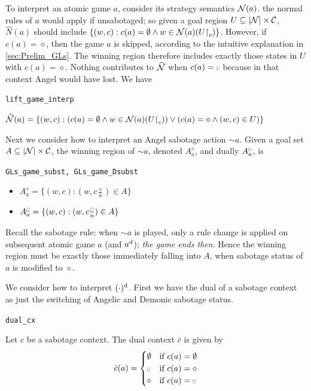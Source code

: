 To interpret an atomic game $a$, consider its strategy semantics $\mathcal N(a)$. the normal rules of $a$ would apply if unsabotaged; so given a goal region $U\subseteq |\mathcal N|\times \mathcal C$, $\widehat N (a)$ should include $\{(w,c): c(a)=\emptyset \wedge w\in \mathcal N(a)(U\mathord{\upharpoonright} _c)\}$. However, if $c(a)=\diamond$, then the game $a$ is skipped, according to the intuitive explanation in \autoref{sec:Prelim_GLs}. The winning region therefore includes exactly those states in $U$ with $c(a)=\diamond$. Nothing contributes to $\widehat {\mathcal{N}}$ when $c(a)=\ssquare$ because in that context Angel would have lost. We have

\begin{bdefinition}
\texttt{lift\_game\_interp}

$\widehat {\mathcal N} (a) = \{(w,c): (c(a)=\emptyset \wedge w\in \mathcal N(a)(U\mathord{\upharpoonright} _c)) \vee (c(a)=\diamond \wedge (w,c)\in U)\}$    
\end{bdefinition}


Next we consider how to interpret an Angel sabotage action $\sim a$. Given a goal set $A\subseteq |\mathcal N|\times \mathcal C$, the winning region of $\sim a$, denoted $A_a^\diamond$, and dually $A_a^{\ssquare}$, is
\begin{bdefinition}
\texttt{GLs\_game\_subst, GLs\_game\_Dsubst}

\begin{itemize}
    \item 
    $A_a^\diamond = \{(w,c): (w,c\frac{\diamond}{a})\in A\}$ \\
    \item 
    $A_a^{\ssquare} = \{(w,c): (w,c\frac{\ssquare}{a})\in A\}$
\end{itemize}
\end{bdefinition}
     
Recall the sabotage rule: when $\sim a$ is played, only a rule change is applied on subsequent atomic game $a$ (and $a^\text{d}$); \textit{the game ends then}. Hence the winning region must be exactly those immediately falling into $A$, when sabotage status of $a$ is modified to $\diamond$.

We consider how to interpret $(\cdot)^\text{d}$. First we have the dual of a sabotage context as just the switching of Angelic and Demonic sabotage status.

\begin{bdefinition}
\texttt{dual\_cx}

    Let $c$ be a sabotage context. The dual context $\bar c$ is given by
    \begin{equation*}
        \bar c(a) = \begin{cases}
            \emptyset & \text{if} \ c(a)=\emptyset\\
            \ssquare & \text{if} \ c(a)=\diamond \\
            \diamond & \text{if} \ c(a)=\ssquare
        \end{cases}
    \end{equation*}
\end{bdefinition}

